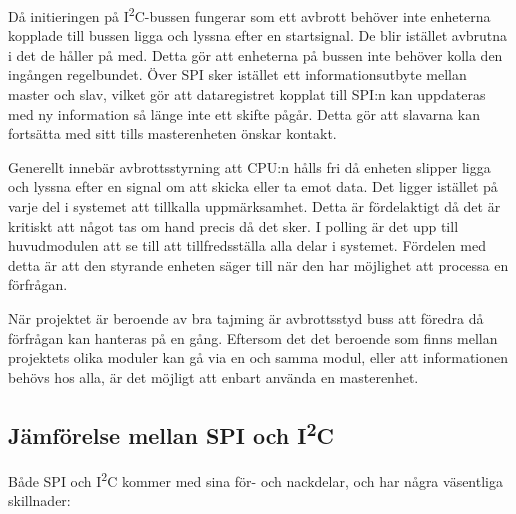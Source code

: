 \documentclass[11pt]{article}
\begin{document}
\begin{flushleft}



Då initieringen på I\textsuperscript{2}C-bussen fungerar som ett avbrott behöver inte enheterna kopplade till bussen ligga och lyssna efter en startsignal. De blir istället avbrutna i det de håller på med.\cite{guideI2C} Detta gör att enheterna på bussen inte behöver kolla den ingången regelbundet. Över SPI sker istället ett informationsutbyte mellan master och slav, vilket gör att dataregistret kopplat till SPI:n kan uppdateras med ny information så länge inte ett skifte pågår. Detta gör att slavarna kan fortsätta med sitt tills masterenheten önskar kontakt. \cite{ATMega16}

Generellt innebär avbrottsstyrning att CPU:n hålls fri då enheten slipper ligga och lyssna efter en signal om att skicka eller ta emot data. Det ligger istället på varje del i systemet att tillkalla uppmärksamhet. Detta är fördelaktigt då det är kritiskt att något tas om hand precis då det sker. I polling är det upp till huvudmodulen att se till att tillfredsställa alla delar i systemet. Fördelen med detta är att den styrande enheten säger till när den har möjlighet att processa en förfrågan. \cite{interruptPoll}

När projektet är beroende av bra tajming är avbrottsstyd buss att föredra då förfrågan kan hanteras på en gång. Eftersom det det beroende som finns mellan projektets olika moduler kan gå via en och samma modul, eller att informationen behövs hos alla, är det möjligt att enbart använda en masterenhet.

\subsection{Jämförelse mellan SPI och I\textsuperscript{2}C}
Både SPI och I\textsuperscript{2}C kommer med sina för- och nackdelar, och har några väsentliga skillnader:


\end{flushleft}
\end{document}
